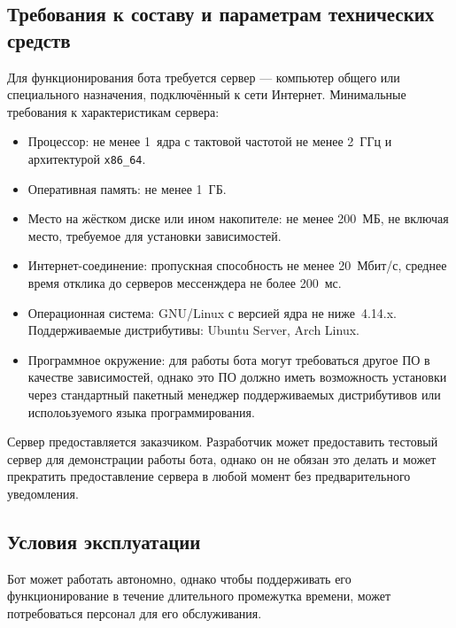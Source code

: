 \subsection{Требования к составу и параметрам технических средств}
    \label{sec:req:hw}
    Для функционирования бота требуется сервер --- компьютер общего или специального назначения,
    подключённый к сети Интернет. Минимальные требования к характеристикам сервера:
    \begin{itemize}
        \item
            Процессор: не менее 1~ядра с тактовой частотой не менее 2~ГГц и архитектурой
            \texttt{x86\_64}.
        \item
            Оперативная память: не менее 1~ГБ.
        \item
            Место на жёстком диске или ином накопителе: не менее 200~МБ, не включая место, требуемое
            для установки зависимостей.
        \item
            Интернет-соединение: пропускная способность не менее 20~Мбит/с, среднее время отклика
            до серверов мессенждера не более 200~мс.
        \item
            Операционная система: GNU/Linux с версией ядра не ниже~4.14.x.
            Поддерживаемые дистрибутивы: Ubuntu Server, Arch Linux.
        \item
            Программное окружение: для работы бота могут требоваться другое ПО в качестве зависимостей,
            однако это ПО должно иметь возможность установки через стандартный пакетный менеджер
            поддерживаемых дистрибутивов или исполоьзуемого языка программирования.
    \end{itemize}
    Сервер предоставляется заказчиком. Разработчик может предоставить тестовый сервер для демонстрации
    работы бота, однако он не обязан это делать и может прекратить предоставление сервера в любой момент
    без предварительного уведомления.

\subsection{Условия эксплуатации}
    \label{sec:req:maint}
    Бот может работать автономно, однако чтобы поддерживать его функционирование в течение
    длительного промежутка времени, может потребоваться персонал для его обслуживания.

